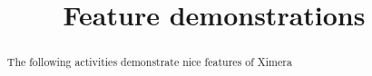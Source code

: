 \documentclass[handout]{ximera}
\title{Feature demonstrations}
\begin{document}
\begin{abstract} The following activities demonstrate nice features of Ximera
\end{abstract}

\maketitle
\end{document}

